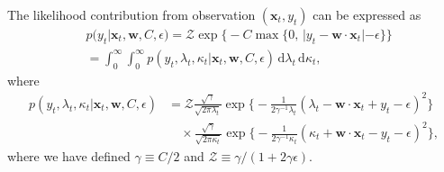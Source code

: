 \begin{theorem}
\label{thm:ilf-likelihood-mixture-rep}
The likelihood contribution from observation $(\mathbf{x}_t, y_t)$ can be expressed as
\begin{align}
\label{eq:ilf-likelihood-mixture-rep}
    & p(y_{t}|\mathbf{x}_{t}, \mathbf{w}, C, \epsilon)
    = \mathcal{Z}\exp\Big\{-C\max\big\{0,\, |y_t - \mathbf{w}\cdot\mathbf{x}_t| - \epsilon\big\}\Big\}
    \nonumber \\
	&= \int_{0}^{\infty}\int_{0}^{\infty}
	p(y_t, \lambda_t, \kappa_t|\mathbf{x}_t, \mathbf{w}, C, \epsilon)\,\mathrm{d}\lambda_t\,\mathrm{d}\kappa_t,
\end{align}
where
\begin{equation}
\label{eq:augmented-ilf-likelihood}
\begin{split}
	p(y_t, \lambda_t, \kappa_t|\mathbf{x}_t, \mathbf{w}, C, \epsilon)
	&= \mathcal{Z}\frac{\sqrt{\gamma}}{\sqrt{2\pi\lambda_t}}\exp\Big\{-\frac{1}{2\gamma^{-1}\lambda_t}(\lambda_t - \mathbf{w}\cdot\mathbf{x}_t + y_t - \epsilon)^2\Big\}
	\\	
	&\quad \times \frac{\sqrt{\gamma}}{\sqrt{2\pi\kappa_t}}\exp\Big\{-\frac{1}{2\gamma^{-1}\kappa_t}(\kappa_t + \mathbf{w}\cdot\mathbf{x}_t - y_t - \epsilon)^2\Big\},
\end{split}
\end{equation}
where we have defined $\gamma \equiv C/2$ and $\mathcal{Z} \equiv \gamma/(1+2\gamma\epsilon)$.
\end{theorem}

